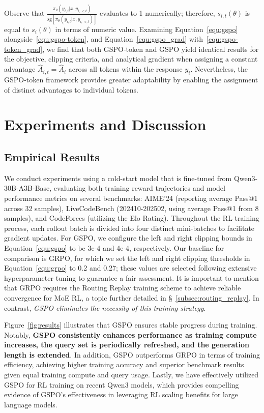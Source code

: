 Observe that $\frac{ \pi_{\theta} (y_{i,t} | x, y_{i,<t}) }{ \mathrm{sg} \left[ \pi_{\theta} (y_{i,t} | x, y_{i,<t}) \right] }$ evaluates to 1 numerically; therefore, $s_{i,t}(\theta)$ is equal to $s_{i}(\theta)$ in terms of numeric value. Examining Equation~\eqref{equ:gspo} alongside~\eqref{equ:gspo-token}, and Equation~\eqref{equ:gspo_grad} with~\eqref{equ:gspo-token_grad}, we find that both GSPO-token and GSPO yield identical results for the objective, clipping criteria, and analytical gradient when assigning a constant advantage $\widehat{A}_{i,t} = \widehat{A}_{i}$ across all tokens within the response $y_i$. Nevertheless, the GSPO-token framework provides greater adaptability by enabling the assignment of distinct advantages to individual tokens.

\section{Experiments and Discussion}

\subsection{Empirical Results}

We conduct experiments using a cold-start model that is fine-tuned from Qwen3-30B-A3B-Base, evaluating both training reward trajectories and model performance metrics on several benchmarks: AIME'24 (reporting average Pass@1 across 32 samples), LiveCodeBench (202410-202502, using average Pass@1 from 8 samples), and CodeForces (utilizing the Elo Rating). Throughout the RL training process, each rollout batch is divided into four distinct mini-batches to facilitate gradient updates. For GSPO, we configure the left and right clipping bounds in Equation~\eqref{equ:gspo} to be 3e-4 and 4e-4, respectively. Our baseline for comparison is GRPO, for which we set the left and right clipping thresholds in Equation~\eqref{equ:grpo} to 0.2 and 0.27; these values are selected following extensive hyperparameter tuning to guarantee a fair assessment. It is important to mention that GRPO requires the Routing Replay training scheme to achieve reliable convergence for MoE RL, a topic further detailed in \S~\ref{subsec:routing_replay}. In contrast, \textit{GSPO eliminates the necessity of this training strategy}.

Figure~\ref{fig:results} illustrates that GSPO ensures stable progress during training. Notably, \textbf{GSPO consistently enhances performance as training compute increases, the query set is periodically refreshed, and the generation length is extended}. In addition, GSPO outperforms GRPO in terms of training efficiency, achieving higher training accuracy and superior benchmark results given equal training compute and query usage. Lastly, we have effectively utilized GSPO for RL training on recent Qwen3 models, which provides compelling evidence of GSPO’s effectiveness in leveraging RL scaling benefits for large language models.

